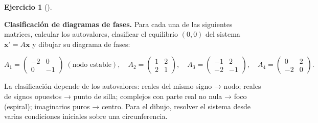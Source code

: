 \documentclass[
  spanish,
  a4paper,
]{scrreport}
\theoremstyle{definition}
\newtheorem{exercise}{Ejercicio}[chapter]
\theoremstyle{remark}
\begin{document}
\begin{exercise}[]\protect\hypertarget{exr-clasificacion-fases}{}\label{exr-clasificacion-fases}

\textbf{Clasificación de diagramas de fases.} Para cada una de las
siguientes matrices, calcular los autovalores, clasificar el equilibrio
\((0,0)\) del sistema \(\mathbf{x}'=A\mathbf{x}\) y dibujar su diagrama
de fases:

\[
A_1 = \begin{pmatrix} -2 & 0 \\ 0 & -1 \end{pmatrix}\;(\text{nodo estable}),\quad
A_2 = \begin{pmatrix} 1 & 2 \\ 2 & 1 \end{pmatrix},\quad
A_3 = \begin{pmatrix} -1 & 2 \\ -2 & -1 \end{pmatrix},\quad
A_4 = \begin{pmatrix} 0 & 2 \\ -2 & 0 \end{pmatrix}.
\]

\begin{tcolorbox}[enhanced jigsaw, arc=.35mm, bottomrule=.15mm, bottomtitle=1mm, breakable, colback=white, colbacktitle=quarto-callout-note-color!10!white, colframe=quarto-callout-note-color-frame, coltitle=black, left=2mm, leftrule=.75mm, opacityback=0, opacitybacktitle=0.6, rightrule=.15mm, title=\textcolor{quarto-callout-note-color}{\faInfo}\hspace{0.5em}{Ayuda}, titlerule=0mm, toprule=.15mm, toptitle=1mm]

La clasificación depende de los autovalores: reales del mismo signo →
nodo; reales de signos opuestos → punto de silla; complejos con parte
real no nula → foco (espiral); imaginarios puros → centro. Para el
dibujo, resolver el sistema desde varias condiciones iniciales sobre una
circunferencia.

\end{tcolorbox}

\begin{tcolorbox}[enhanced jigsaw, arc=.35mm, bottomrule=.15mm, bottomtitle=1mm, breakable, colback=white, colbacktitle=quarto-callout-tip-color!10!white, colframe=quarto-callout-tip-color-frame, coltitle=black, left=2mm, leftrule=.75mm, opacityback=0, opacitybacktitle=0.6, rightrule=.15mm, title=\textcolor{quarto-callout-tip-color}{\faLightbulb}\hspace{0.5em}{Solución}, titlerule=0mm, toprule=.15mm, toptitle=1mm]


\end{tcolorbox}
\end{exercise}
\end{document}
